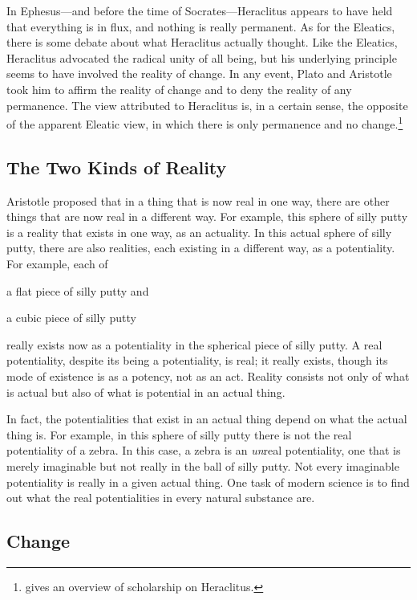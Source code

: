 \documentclass[twocolumn]{article}
\begin{document}
In Ephesus---and before the time of Socrates---Heraclitus appears to have held
that everything is in flux, and nothing is really permanent.  As for the
Eleatics, there is some debate about what Heraclitus actually thought.  Like
the Eleatics, Heraclitus advocated the radical unity of all being, but his
underlying principle seems to have involved the reality of change.  In any
event, Plato and Aristotle took him to affirm the reality of change and to deny
the reality of any permanence.  The view attributed to Heraclitus is, in a
certain sense, the opposite of the apparent Eleatic view, in which there is
only permanence and no change.\footnote{%
   \cite{g2015} gives an overview of scholarship on Heraclitus.%
}

\subsection{The Two Kinds of Reality}

Aristotle proposed that in a thing that is now real in one way, there are other
things that are now real in a different way.  For example, this sphere of silly
putty is a reality that exists in one way, as an actuality.  In this actual
sphere of silly putty, there are also realities, each existing in a different
way, as a potentiality.  For example, each of
\begin{compactitem}
   \item a flat piece of silly putty and
   \item a cubic piece of silly putty
\end{compactitem}
really exists now as a potentiality in the spherical piece of silly putty.  A
real potentiality, despite its being a potentiality, is real; it really exists,
though its mode of existence is as a potency, not as an act.  Reality consists
not only of what is actual but also of what is potential in an actual thing.

In fact, the potentialities that exist in an actual thing depend on what the
actual thing is.  For example, in this sphere of silly putty there is not the
real potentiality of a zebra.  In this case, a zebra is an \emph{un}real
potentiality, one that is merely imaginable but not really in the ball of silly
putty.  Not every imaginable potentiality is really in a given actual thing.
One task of modern science is to find out what the real potentialities in every
natural substance are.

\subsection{Change}
\end{document}
